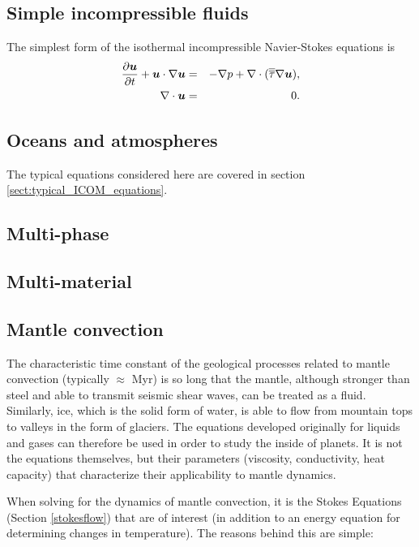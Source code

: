 \subsection{Simple incompressible fluids}
The simplest form of the isothermal incompressible Navier-Stokes equations is
{\setlength\arraycolsep{2pt}
\begin{eqnarray}
\ppt[t]{\bmu} + \bmu\cdot\nabla\bmu &=& -\nabla p + \nabla\cdot(\tautens\nabla\bmu),\\ \label{eq:simple_ns_momentum}
\nabla\cdot\bmu &=& 0. \label{eq:simple_ns_continuity}
\end{eqnarray}}



\subsection{Oceans and atmospheres}
The typical equations considered here are covered in section \ref{sect:typical_ICOM_equations}.

\subsection{Multi-phase}

\subsection{Multi-material}

\subsection{Mantle convection}
\label{mantlespecifics}

The characteristic time constant of the geological processes related to
mantle convection (typically $\approx$ \unit[10]{Myr}) is so long that the mantle,
although stronger than steel and able to transmit seismic shear waves, can
be treated as a fluid. Similarly, ice, which is the solid form of water, is
able to flow from mountain tops to valleys in the form of glaciers. The
equations developed originally for liquids and gases can therefore be used
in order to study the inside of planets. It is not the equations themselves,
but their parameters (\eg viscosity, conductivity, heat capacity) that
characterize their applicability to mantle dynamics.

When solving for the dynamics of mantle convection, it is the Stokes Equations (Section \ref{stokesflow}) that are of interest (in addition to an energy equation for determining changes in temperature). The reasons behind this are simple:

